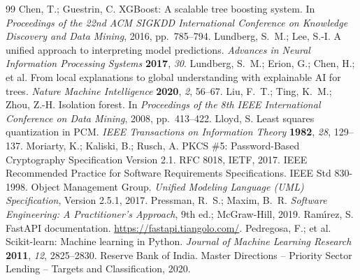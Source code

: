 \documentclass[11pt,a4paper]{article}
\begin{document}
\clearpage
{}
\begin{thebibliography}{99}
 Chen, T.; Guestrin, C. XGBoost: A scalable tree boosting system. In \emph{Proceedings of the 22nd ACM SIGKDD International Conference on Knowledge Discovery and Data Mining}, 2016, pp.~785--794.
 Lundberg, S.~M.; Lee, S.-I. A unified approach to interpreting model predictions. \emph{Advances in Neural Information Processing Systems} \textbf{2017}, \emph{30}.
 Lundberg, S.~M.; Erion, G.; Chen, H.; et al. From local explanations to global understanding with explainable AI for trees. \emph{Nature Machine Intelligence} \textbf{2020}, \emph{2}, 56--67.
 Liu, F.~T.; Ting, K.~M.; Zhou, Z.-H. Isolation forest. In \emph{Proceedings of the 8th IEEE International Conference on Data Mining}, 2008, pp.~413--422.
 Lloyd, S. Least squares quantization in PCM. \emph{IEEE Transactions on Information Theory} \textbf{1982}, \emph{28}, 129--137.
 Moriarty, K.; Kaliski, B.; Rusch, A. PKCS \#5: Password-Based Cryptography Specification Version 2.1. RFC 8018, IETF, 2017.
 IEEE Recommended Practice for Software Requirements Specifications. IEEE Std 830-1998.
 Object Management Group. \emph{Unified Modeling Language (UML) Specification}, Version 2.5.1, 2017.
 Pressman, R.~S.; Maxim, B.~R. \emph{Software Engineering: A Practitioner's Approach}, 9th ed.; McGraw-Hill, 2019.
 Ram\'{\i}rez, S. FastAPI documentation. \url{https://fastapi.tiangolo.com/}.
 Pedregosa, F.; et al. Scikit-learn: Machine learning in Python. \emph{Journal of Machine Learning Research} \textbf{2011}, \emph{12}, 2825--2830.
 Reserve Bank of India. Master Directions -- Priority Sector Lending -- Targets and Classification, 2020.
\end{thebibliography}
\end{document}
